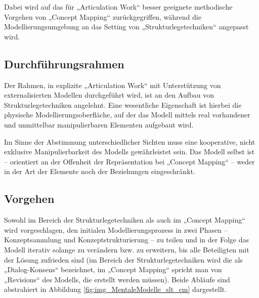 Dabei wird auf das für „Articulation Work“ besser geeignete methodische Vorgehen von „Concept Mapping“ zurückgegriffen, während die Modellierungsumgebung an das Setting von „Strukturlegetechniken“ angepasst wird.

\subsection{Durchführungsrahmen} %
\label{sub:durchführungsrahmen}

Der Rahmen, in explizite „Articulation Work“ mit Unterstützung von externalisierten Modellen durchgeführt wird, ist an den Aufbau von Strukturlegetechniken angelehnt. Eine wesentliche Eigenschaft ist hierbei die physische Modellierungsoberfläche, auf der das Modell mittels real vorhandener und unmittelbar manipulierbaren Elementen aufgebaut wird. 

Im Sinne der Abstimmung unterschiedlicher Sichten muss eine kooperative, nicht exklusive Manipulierbarkeit des Modells gewährleistet sein. Das Modell selbst ist -- orientiert an der Offenheit der Repräsentation bei „Concept Mapping“ -- weder in der Art der Elemente noch der Beziehungen eingeschränkt. 


\subsection{Vorgehen} %
\label{sub:vorgehen}

Sowohl im Bereich der Strukturlegetechniken als auch im „Concept Mapping“ wird vorgeschlagen, den initialen Modellierungsprozess in zwei Phasen -- Konzeptsammlung und Konzeptstrukturierung -- zu teilen und in der Folge das Modell iterativ solange zu verändern bzw. zu erweitern, bis alle Beteiligten mit der Lösung zufrieden sind (im Bereich der Strukturlegetechniken wird die als „Dialog-Konsens“ bezeichnet, im „Concept Mapping“ spricht man von „Revisions“ des Modells, die erstellt werden müssen). Beide Abläufe sind abstrahiert in Abbildung \ref{fig:img_MentaleModelle_slt_cm} dargestellt.


